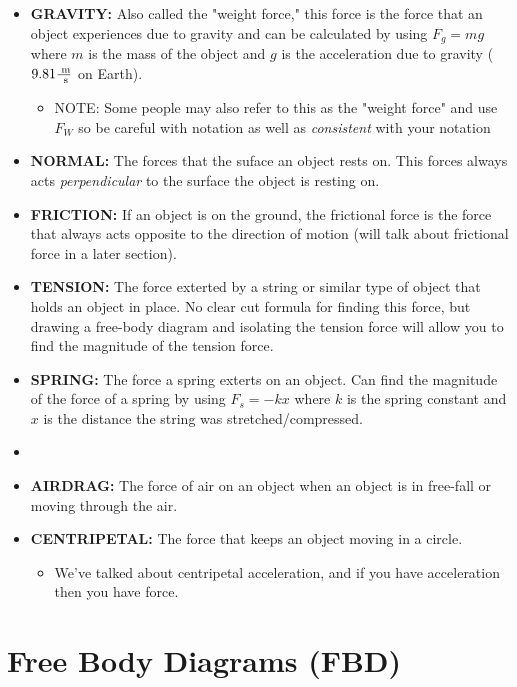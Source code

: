 \begin{itemize}
	\item \textbf{GRAVITY:} Also called the "weight force," this force is the force that an object experiences due to gravity and can be calculated by using $F_g = mg$ where $m$ is the mass of the object and $g$ is the acceleration due to gravity ($9.81\frac{\text{ m}}{\text{ s}}$ on Earth).
	\begin{itemize}
		\item NOTE: Some people may also refer to this as the "weight force" and use $F_W$ so be careful with notation as well as \textit{consistent} with your notation
	\end{itemize}
	\item \textbf{NORMAL:} The forces that the suface an object rests on. This forces always acts \textit{perpendicular} to the surface the object is resting on.
	\item \textbf{FRICTION:} If an object is on the ground, the frictional force is the force that always acts opposite to the direction of motion (will talk about frictional force in a later section).
	\item \textbf{TENSION:} The force exterted by a string or similar type of object that holds an object in place. No clear cut formula for finding this force, but drawing a free-body diagram and isolating the tension force will allow you to find the magnitude of the tension force. 
	\item \textbf{SPRING:} The force a spring exterts on an object. Can find the magnitude of the force of a spring by using $F_s = -kx$ where $k$ is the spring constant and $x$ is the distance the string was stretched/compressed.
	\item \item \textbf{AIRDRAG:} The force of air on an object when an object is in free-fall or moving through the air.
	\item \textbf{CENTRIPETAL:} The force that keeps an object moving in a circle.
	\begin{itemize}
		\item We've talked about centripetal acceleration, and if you have acceleration then you have force.
	\end{itemize}
\end{itemize}


\section{Free Body Diagrams (FBD)}

